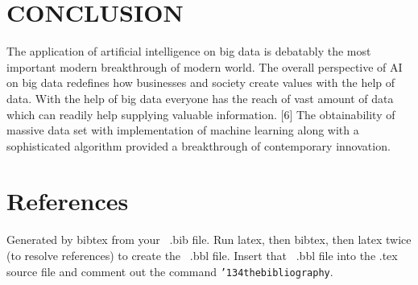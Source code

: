 \documentclass{sig-alternate}
\begin{document}
\section{CONCLUSION}
The application of artificial intelligence on big data is debatably the most important modern breakthrough of modern world. The overall perspective of AI on big data redefines how businesses and society create values with the help of data. With the help of big data everyone has the reach of vast amount of data which can readily help supplying valuable information. [6] The obtainability of massive data set with implementation of machine learning along with a sophisticated algorithm provided a breakthrough of contemporary innovation. 

%

%
%




\section{References}
Generated by bibtex from your ~.bib file.  Run latex,
then bibtex, then latex twice (to resolve references)
to create the ~.bbl file.  Insert that ~.bbl file into
the .tex source file and comment out
the command \texttt{{\char'134}thebibliography}.
\end{document}
